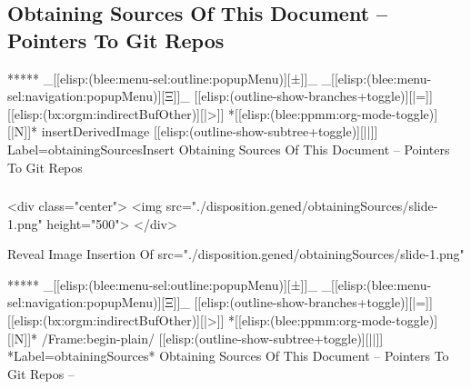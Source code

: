 \begin{whenOrg}
\section{Obtaining Sources Of This Document -- Pointers To Git Repos}


\begin{whenOrg}
*****  _[[elisp:(blee:menu-sel:outline:popupMenu)][±]]_ _[[elisp:(blee:menu-sel:navigation:popupMenu)][Ξ]]_ [[elisp:(outline-show-branches+toggle)][|=]] [[elisp:(bx:orgm:indirectBufOther)][|>]] *[[elisp:(blee:ppmm:org-mode-toggle)][|N]]*  insertDerivedImage [[elisp:(outline-show-subtree+toggle)][||]] Label=obtainingSourcesInsert Obtaining Sources Of This Document -- Pointers To Git Repos
\end{whenOrg}

\begin{frame}[fragile,plain,label=obtainingSourcesInsert]
    \frametitle{}
    \framesubtitle{}


\begin{htmlonly} %
    \begin{rawhtml}
<div class="center">
<img src="./disposition.gened/obtainingSources/slide-1.png" height="500">
</div>
    \end{rawhtml}
\end{htmlonly}

\begin{latexonly}

Reveal Image Insertion Of src="./disposition.gened/obtainingSources/slide-1.png"

\end{latexonly}



\end{frame}


\begin{whenOrg}
*****  _[[elisp:(blee:menu-sel:outline:popupMenu)][±]]_ _[[elisp:(blee:menu-sel:navigation:popupMenu)][Ξ]]_ [[elisp:(outline-show-branches+toggle)][|=]] [[elisp:(bx:orgm:indirectBufOther)][|>]] *[[elisp:(blee:ppmm:org-mode-toggle)][|N]]*  /Frame:begin-plain/ [[elisp:(outline-show-subtree+toggle)][||]] *Label=obtainingSources* Obtaining Sources Of This Document -- Pointers To Git Repos --
\end{whenOrg}


\end{whenOrg}
